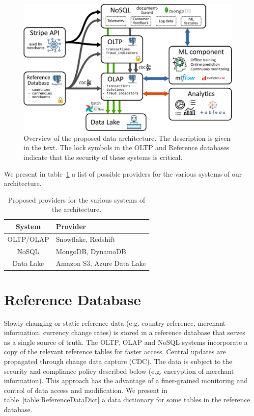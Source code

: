 \documentclass[11pt,a4paper,computermodern]{article}
\begin{document}
\begin{figure}[!htb]
	\centering
	\includegraphics[scale=0.93]{./figures/architecture}
	\caption{Overview of the proposed data architecture. The description is given in the text. The lock symbols in the OLTP and Reference databases indicate that the security of these systems is critical.}
	\label{fig:architecture}
\end{figure}


We present in table~\ref{table:providers} a list of possible providers for the various systems of our architecture.

\begin{table}[!htb]
	\centering
	\begin{threeparttable}
		\caption{Proposed providers for the various systems of the architecture.}
		\label{table:providers}
		\begin{tabularx}{0.99\textwidth}{c >{\centering\arraybackslash}X}
			\toprule
			System & Provider  \\
			\midrule
			OLTP/OLAP & Snowflake, Redshift \\
			NoSQL & MongoDB, DynamoDB \\
			Data Lake & Amazon S3, Azure Data Lake \\
			\bottomrule
		\end{tabularx}
	\end{threeparttable}
\end{table}



\clearpage
\section*{Reference Database}

Slowly changing or static reference data (e.g. country reference, merchant information, currency change rates) is stored in a reference database that serves as a single source of truth. The OLTP, OLAP and NoSQL systems incorporate a copy of the relevant reference tables for faster access. Central updates are propagated through change data capture (CDC). The data is subject to the security and compliance policy described below (e.g. encryption of merchant information). This approach has the advantage of a finer-grained monitoring and control of data access and modification. We present in table~\ref{table:ReferenceDataDict} a data dictionary for some tables in the reference database.
\end{document}
